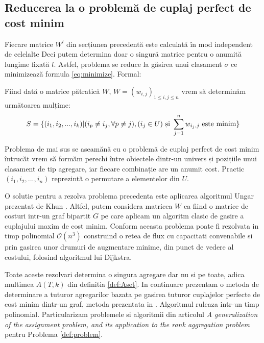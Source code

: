 \subsection{Reducerea la o problemă de cuplaj perfect de cost minim}
Fiecare matrice $W^l$ din secțiunea precedentă este calculată în mod independent de celelalte
Deci putem determina doar o singură matrice pentru o anumită lungime fixată $l$. 
Astfel, problema se reduce la găsirea unui clasament $\sigma$ ce 
minimizează formula \eqref{eq:minimize}. Formal:

\begin{problem}
\label{def:problem}
Fiind dată o matrice pătratică $W$, $W = (w_{i, j})_{1 \leqslant i,j \leqslant n}$ vrem să
determinăm următoarea mulțime:
\[
  S = \{(i_1, i_2, ..., i_k) | (i_p \neq i_j, \forall p \neq j), (i_j \in U) \text{ și } \smashoperator{\sum_{j=1}^n} w_{i_j, j} \text{ este minim}\}
\]
\end{problem}

Problema de mai sus se aseamănă cu o problemă de cuplaj perfect de cost minim întrucăt vrem să 
formăm perechi între obiectele dintr-un univers și pozițiile unui clasament de tip agregare, iar 
fiecare combinație are un anumit cost. Practic $(i_1, i_2, ..., i_n)$ reprezintă o permutare a 
elementelor din $U$.

O solutie pentru a rezolva problema precedenta este aplicarea algoritmul Ungar prezentat de Khun \cite{hungarianmethod}.
Altfel, putem considera matricea $W$ ca fiind o matrice de costuri intr-un graf bipartit $G$ pe care
aplicam un algoritm clasic de gasire a cuplajului maxim de cost minim. Conform \cite{flowassignment}
aceasta problema poate fi rezolvata in timp polinomial $\mathcal{O}(n^3)$ construind o retea de flux
cu capacitati convenabile si prin gasirea unor drumuri de augmentare minime, din punct de vedere
al costului, folosind algoritmul lui Dijkstra\cite{dijkstra}.

Toate aceste rezolvari determina o singura agregare dar nu si pe toate, adica multimea $A(T, k)$ din
definitia \ref{def:Aset}. In continuare prezentam o metoda de determinare a tuturor agregarilor 
bazata pe gasirea tuturor cuplajelor perfecte de cost minim dintr-un graf, metoda prezentata in \cite{allmatchings}.
Algoritmul ruleaza intr-un timp polinomial. Particularizam problemele si algoritmii din articolul 
\textit{A generalization of the assignment problem, and its application to the rank aggregation 
problem} \cite{allmatchings} pentru Problema \ref{def:problem}.


